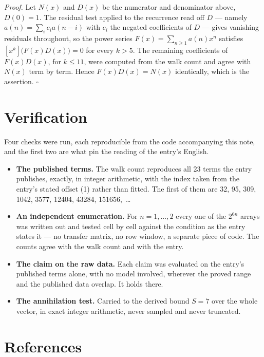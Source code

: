\documentclass[11pt]{article}
\theoremstyle{definition}
\begin{document}
{\itshape Proof.} Let $N(x)$ and $D(x)$ be the numerator and denominator above, $D(0)=1$. The residual test applied to the recurrence read off $D$ --- namely $a(n) = \sum_i c_i a(n-i)$ with $c_i$ the negated coefficients of $D$ --- gives vanishing residuals throughout, so the power series $F(x)=\sum_{n\ge 1}a(n)x^n$ satisfies $[x^k]\bigl(F(x)D(x)\bigr) = 0$ for every $k > 5$. The remaining coefficients of $F(x)D(x)$, for $k \le 11$, were computed from the walk count and agree with $N(x)$ term by term. Hence $F(x)D(x) = N(x)$ identically, which is the assertion. $\square$

\section{Verification}

Four checks were run, each reproducible from the code accompanying this note, and the first two are what pin the reading of the entry's English.

\begin{itemize}

\item {\bfseries The published terms.} The walk count reproduces all 23 terms the entry publishes, exactly, in integer arithmetic, with the index taken from the entry's stated offset (1) rather than fitted. The first of them are 32, 95, 309, 1042, 3577, 12404, 43284, 151656,~\dots

\item {\bfseries An independent enumeration.} For $n = 1,\dots,2$ every one of the $2^{6n}$ arrays was written out and tested cell by cell against the condition as the entry states it --- no transfer matrix, no row window, a separate piece of code. The counts agree with the walk count and with the entry.

\item {\bfseries The claim on the raw data.} Each claim was evaluated on the entry's published terms alone, with no model involved, wherever the proved range and the published data overlap. It holds there.

\item {\bfseries The annihilation test.} Carried to the derived bound $S = 7$ over the whole vector, in exact integer arithmetic, never sampled and never truncated.

\end{itemize}

\section{References}
\end{document}
